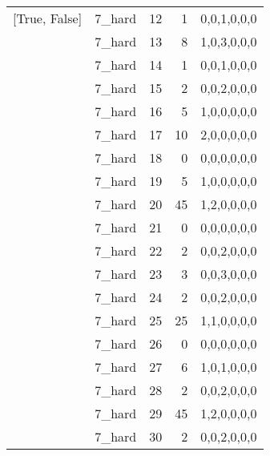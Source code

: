 \begin{tabular}{llrrl}
 [True, False]   & 7\_hard              &            12 &                     1 & 0,0,1,0,0,0   \\
 [True, False]   & 7\_hard              &            13 &                     8 & 1,0,3,0,0,0   \\
 [True, False]   & 7\_hard              &            14 &                     1 & 0,0,1,0,0,0   \\
 [True, False]   & 7\_hard              &            15 &                     2 & 0,0,2,0,0,0   \\
 [True, False]   & 7\_hard              &            16 &                     5 & 1,0,0,0,0,0   \\
 [True, False]   & 7\_hard              &            17 &                    10 & 2,0,0,0,0,0   \\
 [True, False]   & 7\_hard              &            18 &                     0 & 0,0,0,0,0,0   \\
 [True, False]   & 7\_hard              &            19 &                     5 & 1,0,0,0,0,0   \\
 [True, False]   & 7\_hard              &            20 &                    45 & 1,2,0,0,0,0   \\
 [True, False]   & 7\_hard              &            21 &                     0 & 0,0,0,0,0,0   \\
 [True, False]   & 7\_hard              &            22 &                     2 & 0,0,2,0,0,0   \\
 [True, False]   & 7\_hard              &            23 &                     3 & 0,0,3,0,0,0   \\
 [True, False]   & 7\_hard              &            24 &                     2 & 0,0,2,0,0,0   \\
 [True, False]   & 7\_hard              &            25 &                    25 & 1,1,0,0,0,0   \\
 [True, False]   & 7\_hard              &            26 &                     0 & 0,0,0,0,0,0   \\
 [True, False]   & 7\_hard              &            27 &                     6 & 1,0,1,0,0,0   \\
 [True, False]   & 7\_hard              &            28 &                     2 & 0,0,2,0,0,0   \\
 [True, False]   & 7\_hard              &            29 &                    45 & 1,2,0,0,0,0   \\
 [True, False]   & 7\_hard              &            30 &                     2 & 0,0,2,0,0,0   \\

\end{tabular}
